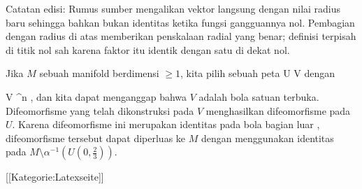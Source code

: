 Catatan edisi: Rumus sumber mengalikan vektor langsung dengan nilai radius baru sehingga bahkan bukan identitas ketika fungsi gangguannya nol. Pembagian dengan radius di atas memberikan penskalaan radial yang benar; definisi terpisah di titik nol sah karena faktor itu identik dengan satu di dekat nol.

Jika $M$ sebuah manifold berdimensi $\geq 1$, kita pilih sebuah peta
\maabbdisp {\alpha} { U } {V
} {}
dengan

\mavergleichskette
{\vergleichskette
{ V
}
{ \subseteq }{  \R^n
}
{  }{
}
{    }{
}
{   }{
}
}
{}{}{,}
dan kita dapat menganggap
 {} {}
bahwa $V$
 {} {}
adalah bola satuan terbuka. Difeomorfisme yang telah dikonstruksi pada $V$ menghasilkan difeomorfisme pada $U$. Karena difeomorfisme ini merupakan identitas pada bola bagian luar
 {} {},
difeomorfisme tersebut dapat diperluas ke $M$ dengan menggunakan identitas pada $M \setminus \alpha^{-1} \left(  U \left(   0 , { \frac{   2 }{  3 } }   \right)  \right)$.

 [[Kategorie:Latexseite]]
